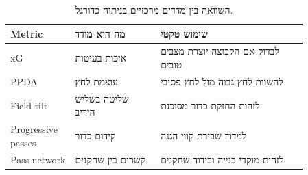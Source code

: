 \begin{table}[h]
\centering
\small
\begin{tabular}{p{0.18\linewidth}p{0.25\linewidth}p{0.43\linewidth}}
\toprule
Metric & מה הוא מודד & שימוש טקטי \\
\midrule
xG & איכות בעיטות & לבדוק אם הקבוצה יוצרת מצבים טובים \\
PPDA & עוצמת לחץ & להשוות לחץ גבוה מול לחץ פסיבי \\
Field tilt & שליטה בשליש היריב & לזהות החזקת כדור מסוכנת \\
Progressive passes & קידום כדור & למדוד שבירת קווי הגנה \\
Pass network & קשרים בין שחקנים & לזהות מוקדי בנייה ובידוד שחקנים \\
\bottomrule
\end{tabular}
\normalsize
\caption{השוואה בין מדדים מרכזיים בניתוח כדורגל.}
\end{table}